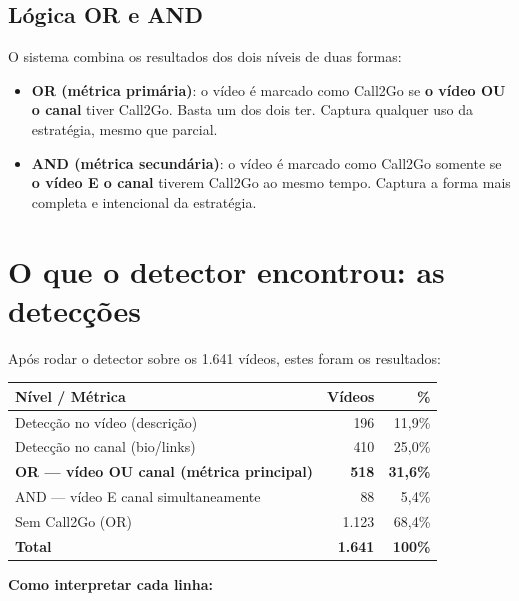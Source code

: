 \documentclass[12pt,a4paper]{article}
\begin{document}
\subsection{Lógica OR e AND}

O sistema combina os resultados dos dois níveis de duas formas:

\begin{itemize}
  \item \textbf{OR (métrica primária)}: o vídeo é marcado como Call2Go se
        \textbf{o vídeo OU o canal} tiver Call2Go. Basta um dos dois ter.
        Captura qualquer uso da estratégia, mesmo que parcial.
  \item \textbf{AND (métrica secundária)}: o vídeo é marcado como Call2Go
        somente se \textbf{o vídeo E o canal} tiverem Call2Go ao mesmo tempo.
        Captura a forma mais completa e intencional da estratégia.
\end{itemize}

\section{O que o detector encontrou: as detecções}

Após rodar o detector sobre os 1.641 vídeos, estes foram os resultados:

\medskip
\begin{center}
\begin{tabular}{lrr}
\toprule
\textbf{Nível / Métrica} & \textbf{Vídeos} & \textbf{\%} \\
\midrule
Detecção no vídeo (descrição) & 196 & 11,9\% \\
Detecção no canal (bio/links) & 410 & 25,0\% \\
\midrule
\textbf{OR --- vídeo OU canal (métrica principal)} & \textbf{518} & \textbf{31,6\%} \\
AND --- vídeo E canal simultaneamente           & 88  & 5,4\%  \\
Sem Call2Go (OR)                                & 1.123 & 68,4\% \\
\midrule
\textbf{Total}                                  & \textbf{1.641} & \textbf{100\%} \\
\bottomrule
\end{tabular}
\end{center}
\medskip

\textbf{Como interpretar cada linha:}
\end{document}

